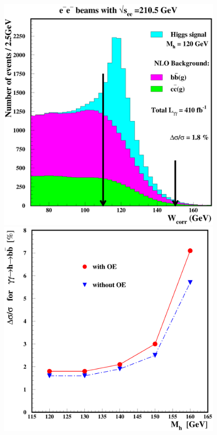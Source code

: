  
\begin{figure}[thb]
\vspace*{-.5cm}
{\centering \resizebox*{!}{0.38\textheight}
{\includegraphics{./sm4/Tesla-gamma-bb-signal.eps}}
\hspace*{-5mm} \resizebox*{!}{0.38\textheight}
{\includegraphics{./sm4/Tesla-gamma-bb-precision.eps}} }

\end{figure}
